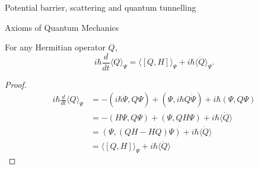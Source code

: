 \documentclass[a4paper]{article}
\theoremstyle{definition}
\begin{document}
Potential barrier, scattering and quantum tunnelling

Axioms of Quantum Mechanics

\begin{theorem}
  For any Hermitian operator \(Q\),
  \[
    i\hbar \frac{d}{dt}\langle Q\rangle_\Psi = \langle[Q,H]\rangle_\Psi + i\hbar \langle \dot{Q}\rangle_\Psi.
  \]
  
\end{theorem}

\begin{proof}
  \begin{align*}
    i\hbar \frac{d}{dt}\langle Q\rangle_\Psi &= -(i\hbar \dot{\Psi},Q\Psi) + (\Psi, i\hbar Q\dot{\Psi}) + i\hbar(\Psi, Q\Psi)\\
                                             &= -(H\Psi, Q\Psi) + (\Psi, QH\Psi) + i\hbar\langle\dot{Q}\rangle\\
                                             &= (\Psi, (QH-HQ)\Psi) + i\hbar\langle\dot{Q}\rangle\\
                                             &= \langle[Q,H]\rangle_\Psi + i\hbar\langle\dot{Q}\rangle
  \end{align*}
\end{proof}
\end{document}
